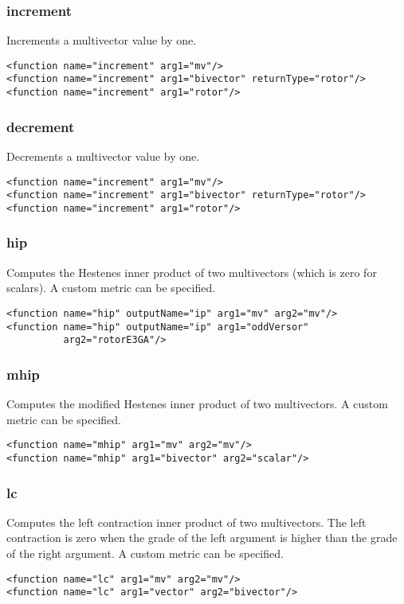 \documentclass[10pt, a4paper]{article}
\begin{document}
\subsubsection*{increment}

Increments a multivector value by one.
\begin{verbatim}
<function name="increment" arg1="mv"/>
<function name="increment" arg1="bivector" returnType="rotor"/>
<function name="increment" arg1="rotor"/>
\end{verbatim}

\subsubsection*{decrement}

Decrements a multivector value by one.
\begin{verbatim}
<function name="increment" arg1="mv"/>
<function name="increment" arg1="bivector" returnType="rotor"/>
<function name="increment" arg1="rotor"/>
\end{verbatim}

\subsubsection*{hip}

Computes the Hestenes inner product of two multivectors (which is zero for scalars).
A custom metric can be specified.
\begin{verbatim}
<function name="hip" outputName="ip" arg1="mv" arg2="mv"/>
<function name="hip" outputName="ip" arg1="oddVersor"
          arg2="rotorE3GA"/>
\end{verbatim}

\subsubsection*{mhip}

Computes the modified Hestenes inner product of two multivectors.
A custom metric can be specified.
\begin{verbatim}
<function name="mhip" arg1="mv" arg2="mv"/>
<function name="mhip" arg1="bivector" arg2="scalar"/>
\end{verbatim}

\subsubsection*{lc}

Computes the left contraction inner product of two multivectors.
The left contraction is zero when the grade of the left argument
is higher than the grade of the right argument.
A custom metric can be specified.
\begin{verbatim}
<function name="lc" arg1="mv" arg2="mv"/>
<function name="lc" arg1="vector" arg2="bivector"/>
\end{verbatim}
\end{document}
